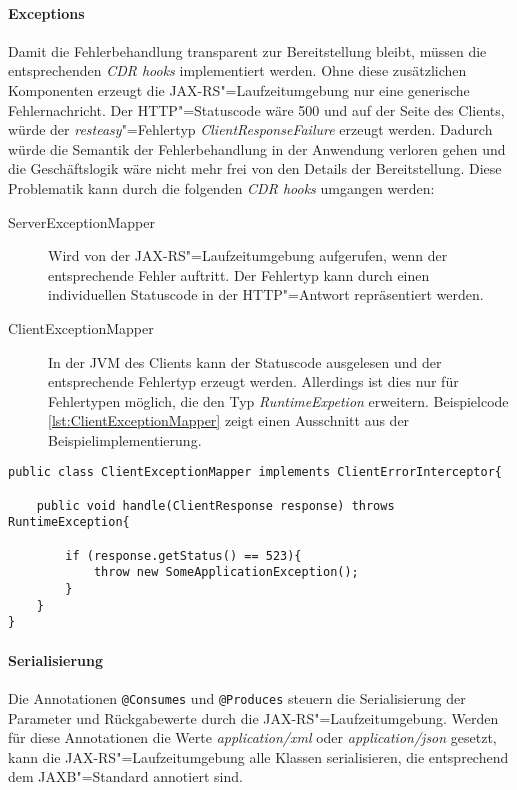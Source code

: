 \paragraph{Exceptions}
Damit die Fehlerbehandlung transparent zur Bereitstellung bleibt, müssen die entsprechenden \textit{CDR hooks} implementiert werden. Ohne diese zusätzlichen Komponenten erzeugt die \ac{JAX-RS}"=Laufzeitumgebung nur eine generische Fehlernachricht. 
Der \ac{HTTP}"=Statuscode wäre 500 und auf der Seite des Clients, würde der \textit{resteasy}"=Fehlertyp \textit{ClientResponseFailure} erzeugt werden. 
Dadurch würde die Semantik der Fehlerbehandlung in der Anwendung verloren gehen und die Geschäftslogik wäre nicht mehr frei von den Details der Bereitstellung. Diese Problematik kann durch die folgenden \textit{CDR hooks} umgangen werden:
\begin{description}
\item [ServerExceptionMapper] Wird von der \ac{JAX-RS}"=Laufzeitumgebung aufgerufen, wenn der entsprechende Fehler auftritt. Der Fehlertyp kann durch einen individuellen Statuscode in der \ac{HTTP}"=Antwort repräsentiert werden.
\item [ClientExceptionMapper] In der \ac{JVM} des Clients kann der Statuscode ausgelesen und der entsprechende Fehlertyp erzeugt werden. Allerdings ist dies nur für Fehlertypen möglich, die den Typ \textit{RuntimeExpetion} erweitern. Beispielcode \ref{lst:ClientExceptionMapper} zeigt einen Ausschnitt aus der Beispielimplementierung.
\end{description}
\begin{lstlisting}[caption={ClientExceptionMapper},captionpos=b,label=lst:ClientExceptionMapper] 
public class ClientExceptionMapper implements ClientErrorInterceptor{

	public void handle(ClientResponse response) throws RuntimeException{
			
		if (response.getStatus() == 523){
			throw new SomeApplicationException();
		}
	}
}
\end{lstlisting}
\paragraph{Serialisierung}
Die Annotationen \colorbox{mygray}{\lstinline!@Consumes!} und \colorbox{mygray}{\lstinline!@Produces!} steuern die Serialisierung der Parameter und Rückgabewerte durch die \ac{JAX-RS}"=Laufzeitumgebung. 
Werden für diese Annotationen die Werte \textit{application/xml} oder \textit{application/json} gesetzt, kann die \ac{JAX-RS}"=Laufzeitumgebung alle Klassen serialisieren, die entsprechend dem \ac{JAXB}"=Standard annotiert sind.  
\newpage